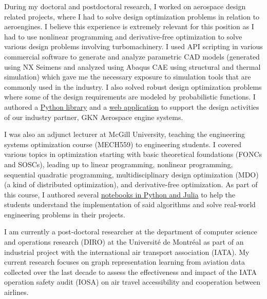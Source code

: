 \documentclass[12pt]{article} %
\begin{document}
During my doctoral and postdoctoral research, I worked on aerospace design related projects, where I had to solve design optimization problems in relation to aeroengines. I believe this experience is extremely relevant for this position as I had to use nonlinear programming and derivative-free optimization to solve various design problems involving turbomachinery. I used API scripting in various commercial software to generate and analyze parametric CAD models (generated using NX Seimens and analyzed using Abaqus CAE using structural and thermal simulation) which gave me the necessary exposure to simulation tools that are commonly used in the industry. I also solved robust design optimization problems where some of the design requirements are modeled by probabilistic functions. I authored a \href{https://sed-group.github.io/mvmlib/index.html}{Python library} and a \href{https://github.com/khbalhandawi/scale_AM_webapp}{web application} to support the design activities of our industry partner, GKN Aerospace engine systems.

\medskip %

I was also an adjunct lecturer at McGill University, teaching the engineering systems optimization course (MECH559) to engineering students. I covered various topics in optimization starting with basic theoretical foundations (FONCs and SOSCs), leading up to linear programming, nonlinear programming, sequential quadratic programming, multidisciplinary design optimization (MDO) (a kind of distributed optimization), and derivative-free optimization. As part of this course, I authored several \href{https://github.com/khbalhandawi/MECH559_notebooks}{notebooks in Python and Julia} to help the students understand the implementation of said algorithms and solve real-world engineering problems in their projects.

\medskip %

I am currently a post-doctoral researcher at the department of computer science and operations research (DIRO) at the Universit\'{e} de Montr\'{e}al as part of an industrial project with the international air transport association (IATA). My current research focuses on graph representation learning from aviation data collected over the last decade to assess the effectiveness and impact of the IATA operation safety audit (IOSA) on air travel accessibility and cooperation between airlines. 

\medskip %
\end{document}
